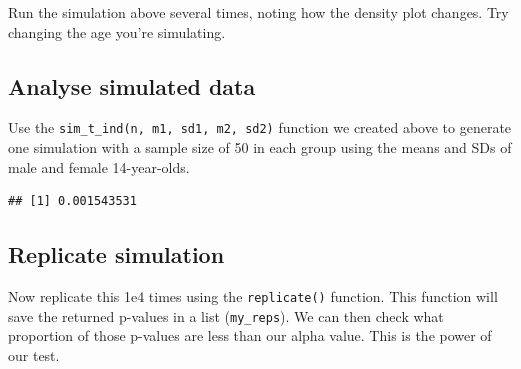 \documentclass[
  oneside]{book}
\newenvironment{Shaded}{\begin{snugshade}}{\end{snugshade}}
\newcommand{\DecValTok}[1]{\textcolor[rgb]{0.00,0.00,0.81}{#1}}
\newcommand{\FunctionTok}[1]{\textcolor[rgb]{0.00,0.00,0.00}{#1}}
\newcommand{\NormalTok}[1]{#1}
\newcommand{\OtherTok}[1]{\textcolor[rgb]{0.56,0.35,0.01}{#1}}
\newcommand{\SpecialCharTok}[1]{\textcolor[rgb]{0.00,0.00,0.00}{#1}}
\newcommand{\StringTok}[1]{\textcolor[rgb]{0.31,0.60,0.02}{#1}}
\begin{document}
\begin{try}
Run the simulation above several times, noting how the density plot changes. Try changing the age you're simulating.

\end{try}

\hypertarget{analyse-simulated-data}{%
\subsection{Analyse simulated data}\label{analyse-simulated-data}}

Use the \texttt{sim\_t\_ind(n,\ m1,\ sd1,\ m2,\ sd2)} function we created above to generate one simulation with a sample size of 50 in each group using the means and SDs of male and female 14-year-olds.

\begin{Shaded}
\end{Shaded}

\begin{verbatim}
## [1] 0.001543531
\end{verbatim}

\hypertarget{replicate-simulation}{%
\subsection{Replicate simulation}\label{replicate-simulation}}

Now replicate this 1e4 times using the \texttt{replicate()} function. This function will save the returned p-values in a list (\texttt{my\_reps}). We can then check what proportion of those p-values are less than our alpha value. This is the power of our test.
\end{document}
